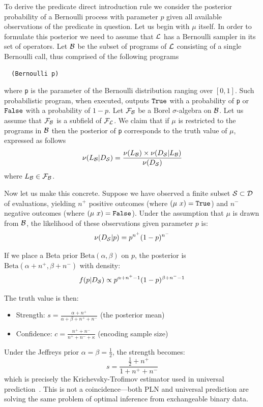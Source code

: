 \documentclass[]{article}
\begin{document}
To derive the predicate direct introduction rule we consider the
posterior probability of a Bernoulli process with parameter $p$ given
all available observations of the predicate in question.  Let us begin
with $\mu$ itself.  In order to formulate this posterior we need to
assume that $\mathcal{L}$ has a Bernoulli sampler in its set of
operators.  Let $\mathcal{B}$ be the subset of programs of $\mathcal{L}$
consisting of a single Bernoulli call, thus comprised of the
following programs
\begin{verbatim}
  (Bernoulli p)
\end{verbatim}
where \texttt{p} is the parameter of the Bernoulli
distribution ranging over $[0, 1]$.  Such probabilistic program, when
executed, outputs $\texttt{True}$ with a probability of \texttt{p} or
$\texttt{False}$ with a probability of $1 - p$.  Let
$\mathcal{F}_{\mathcal{B}}$ be a Borel $\sigma$-algebra on $\mathcal{B}$.
Let us assume that $\mathcal{F}_{\mathcal{B}}$ is a subfield of
$\mathcal{F}_{\mathcal{L}}$.  We claim that if $\mu$ is restricted to
the programs in $\mathcal{B}$ then the posterior of
\texttt{p} corresponds to the truth value of $\mu$,
expressed as follows
$$\nu(L_{\mathcal{B}} | D_{\mathcal{S}}) = \frac{\nu(L_{\mathcal{B}}) \times
  \nu(D_{\mathcal{S}} | L_{\mathcal{B}})}{\nu(D_{\mathcal{S}})}$$ where $L_{\mathcal{B}}
\in \mathcal{F}_{\mathcal{B}}$.

Now let us make this concrete.  Suppose we have observed a finite
subset $\mathcal{S} \subset \mathcal{D}$ of evaluations, yielding $n^+$
positive outcomes (where $(\mu\ x) = \texttt{True}$) and $n^-$ negative outcomes
(where $(\mu\ x) = \texttt{False}$).  Under the assumption that $\mu$ is drawn
from $\mathcal{B}$, the likelihood of these observations given
parameter $p$ is:
$$\nu(D_{\mathcal{S}} | p) = p^{n^+} (1-p)^{n^-}$$

If we place a Beta prior $\text{Beta}(\alpha, \beta)$ on $p$, the
posterior is $\text{Beta}(\alpha + n^+, \beta + n^-)$ with density:
$$f(p | D_{\mathcal{S}}) \propto p^{\alpha + n^+ - 1}(1-p)^{\beta + n^- - 1}$$

The truth value is then:
\begin{itemize}
\item Strength: $s = \frac{\alpha + n^+}{\alpha + \beta + n^+ + n^-}$
  (the posterior mean)
\item Confidence: $c = \frac{n^+ + n^-}{n^+ + n^- + \kappa}$ (encoding
  sample size)
\end{itemize}

Under the Jeffreys prior $\alpha = \beta = \frac{1}{2}$, the strength
becomes:
$$s = \frac{\frac{1}{2} + n^+}{1 + n^+ + n^-}$$
which is precisely the Krichevsky-Trofimov estimator used in universal
prediction~\cite{hutter2005universal}.  This is not a coincidence---both PLN and
universal prediction are solving the same problem of optimal inference
from exchangeable binary data.
\end{document}
